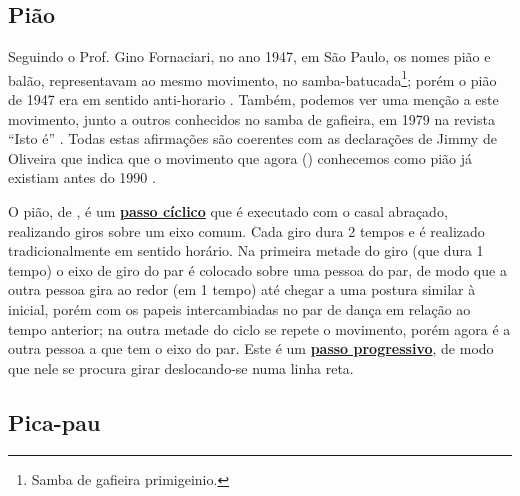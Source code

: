  
\subsection{Pião}

Seguindo o Prof. Gino Fornaciari, no ano 1947,  em São Paulo, os nomes pião e balão,
representavam ao mesmo movimento, no samba-batucada\footnote{Samba de gafieira primigeinio.}; 
porém o pião de 1947 era em sentido anti-horario \cite[pp. 68-72]{fornaciari1947aprender}.
Também, podemos ver uma menção a este movimento, junto a outros conhecidos no samba de gafieira, 
em 1979 na revista ``Isto é'' \cite[pp. 89]{revista1979isto}.
Todas estas afirmações são coerentes com as declarações de Jimmy de Oliveira 
que indica que o movimento que agora (\AnoLivro) conhecemos como pião 
já existiam antes do 1990 \cite{sambafunkeadoJimmyDeOliveiraPart1}.

O pião, de \AnoLivro, é um \hyperref[def:PassoCiclico]{\textbf{passo cíclico}} que é executado com o casal abraçado, 
realizando giros sobre um eixo comum.
Cada giro dura 2 tempos e é realizado tradicionalmente em sentido horário.
Na primeira metade do giro (que dura 1 tempo) o eixo de giro do par é colocado sobre uma pessoa do par, 
de modo que a outra pessoa gira ao redor (em 1 tempo) até chegar a uma postura similar à inicial, 
porém com os papeis intercambiadas no par de dança em relação ao tempo anterior;
na outra metade do ciclo se repete o movimento, porém agora é a outra pessoa a que tem o eixo do par.
Este é um \hyperref[def:PassoDeDeslocamento]{\textbf{passo progressivo}}, 
de modo que nele se procura girar deslocando-se numa linha reta.

\subsection{Pica-pau} 

